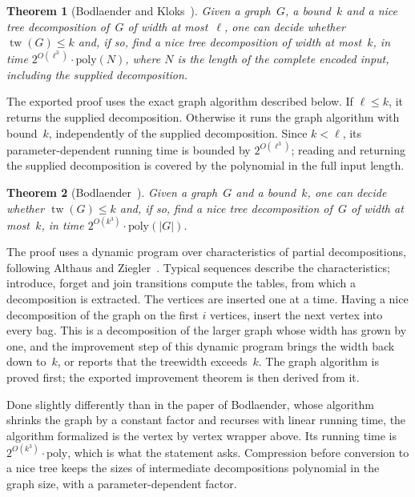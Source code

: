 \documentclass[11pt,a4paper]{article}
\newtheorem{theorem}{Theorem}
\theoremstyle{definition}
\newcommand{\tw}{\operatorname{tw}}
\begin{document}
\begin{theorem}[Bodlaender and Kloks~\cite{bodlaender1996efficient}]
\label{thm:bk}
Given a graph~$G$, a bound~$k$ and a nice tree decomposition of~$G$ of width at most~$\ell$, one can
decide whether $\tw(G)\le k$ and, if so, find a nice tree decomposition of width at most~$k$, in
time $2^{O(\ell^3)}\cdot\mathrm{poly}(N)$, where $N$ is the length of the complete encoded input, including the supplied decomposition.
\end{theorem}
The exported proof uses the exact graph algorithm described below. If $\ell\le k$, it returns
the supplied decomposition. Otherwise it runs the graph algorithm with bound~$k$, independently
of the supplied decomposition. Since $k<\ell$, its parameter-dependent running time is bounded
by $2^{O(\ell^3)}$; reading and returning the supplied decomposition is covered by the polynomial
in the full input length.

\begin{theorem}[Bodlaender~\cite{bodlaender1996linear}]
\label{thm:bod}
Given a graph~$G$ and a bound~$k$, one can decide whether $\tw(G)\le k$ and, if so, find a nice
tree decomposition of~$G$ of width at most~$k$, in time $2^{O(k^3)}\cdot\mathrm{poly}(|G|)$.
\end{theorem}
The proof uses a dynamic program over characteristics of partial decompositions, following Althaus and Ziegler~\cite{althaus2020optimal}. Typical sequences describe the characteristics; introduce, forget and join transitions compute the tables, from which a decomposition is extracted. The vertices are inserted one at a time. Having a
nice decomposition of the graph on the first $i$ vertices, insert the next vertex into every bag.
This is a decomposition of the larger graph whose width has grown by one, and the improvement step
of this dynamic program brings the width back down to~$k$, or reports that the treewidth exceeds~$k$. The graph algorithm is proved first; the exported improvement theorem is then derived from it.

Done slightly differently than in the paper of Bodlaender, whose algorithm shrinks the graph by a
constant factor and recurses with linear running time, the algorithm formalized is the vertex by
vertex wrapper above. Its running time is $2^{O(k^3)}\cdot\mathrm{poly}$, which is what the
statement asks. Compression before conversion to a nice tree keeps the sizes of intermediate
decompositions polynomial in the graph size, with a parameter-dependent factor.
\end{document}
